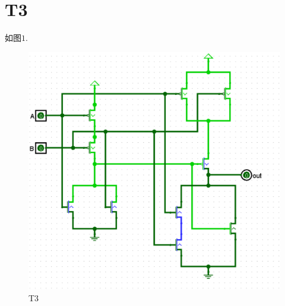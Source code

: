 \documentclass{article}
\begin{document}
\section*{T3}如图$1$.
\begin{figure}
    \centering
    \includegraphics[scale=0.3]{picture/xor.eps}
    \caption{T3}
\end{figure}
\end{document}
